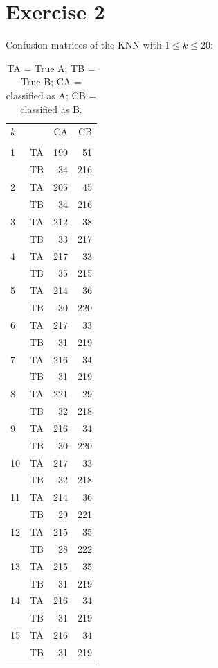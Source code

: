 \documentclass[a4paper,11pt]{article}
\begin{document}


\section*{Exercise 2}
Confusion matrices of the KNN with $1 \leq k \leq 20$:

\begin{table}
  \caption{TA = True A; TB = True B; CA = classified as A; CB = classified as B.}
\begin{tabular}{lcrr}
$k$ && CA & CB \\ \\
 1 & TA & 199 &    51 \\
& TB &  34 &   216 \\
 2 & TA & 205 &    45 \\
& TB &  34 &   216 \\
 3 & TA & 212 &    38 \\
& TB &  33 &   217 \\
 4 & TA & 217 &    33 \\
& TB &  35 &   215 \\
 5 & TA & 214 &    36 \\
& TB &  30 &   220 \\
 6 & TA & 217 &    33 \\
& TB &  31 &   219 \\
 7 & TA & 216 &    34 \\
& TB &  31 &   219 \\
 8 & TA & 221 &    29 \\
& TB &  32 &   218 \\
 9 & TA & 216 &    34 \\
& TB &  30 &   220 \\
 10 & TA & 217 &    33 \\
& TB &  32 &   218 \\
 11 & TA & 214 &    36 \\
& TB &  29 &   221 \\
 12 & TA & 215 &    35 \\
& TB &  28 &   222 \\
 13 & TA & 215 &    35 \\
& TB &  31 &   219 \\
 14 & TA & 216 &    34 \\
& TB &  31 &   219 \\
 15 & TA & 216 &    34 \\
& TB &  31 &   219 \\

\end{tabular}
\end{table}
\end{document}
